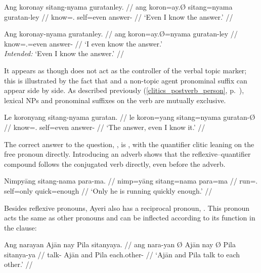 \pex
\a\label{ex:sitangquant}\begingl
	\gla Ang koronay sitang-nyama guratanley. //
	\glb ang koron=ay.Ø sitang=nyama guratan-ley //
	\glc \AgtT{} know=\Fsg{}.\Top{} self=even answer-\PargI{} //
	\glft `Even I know the answer.' //
\endgl

\a\label{ex:nositangquant}\ljudge\excl\begingl
	\gla Ang koronay-nyama guratanley. //
	\glb ang koron=ay.Ø=nyama guratan-ley //
	\glc \AgtT{} know=\Fsg{}.\Top{}=even answer-\PargI{} //
	\glft `I even know the answer.' \\
		\textit{Intended:} `Even I know the answer.' //
\endgl
\xe

It appears as though  does not act as the controller of the
verbal topic marker; this is illustrated by the fact that 
and a non-topic agent pronominal suffix can appear side by side. As described
previously (\autoref{clitics_postverb_person},
p.~\pageref{clitics_postverb_person}), lexical NPs and pronominal suffixes on
the verb are mutually exclusive.

\ex\begingl
	\gla Le koronyang sitang-nyama guratan. //
	\glb le koron=yang sitang=nyama guratan-Ø //
	\glc \PatTI{} know=\Fsg{}.\Aarg{} self=even answer-\Top{} //
	\glft `The answer, even I know it.' //
\endgl\xe

The correct answer to the question, , is ,
with the quantifier clitic leaning on the free pronoun directly. Introducing an
adverb shows that the reflexive--quantifier compound follows the conjugated
verb directly, even before the adverb.

\ex\begingl
	\gla Nimpyāng sitang-nama para-ma. //
	\glb nimp=yāng sitang=nama para=ma //
	\glc run=\TsgM{}.\Aarg{} self=only quick=enough //
	\glft `Only he is running quickly enough.' //
\endgl\xe


Besides reflexive pronouns, Ayeri also has a reciprocal pronoun,
. This pronoun acts the same as other pronouns
and can be inflected according to its function in the clause:

\pex
\a\begingl
	\gla Ang narayan {} Ajān nay {} Pila sitanyaya. //
	\glb ang nara-yan Ø Ajān nay Ø Pila sitanya-ya //
	\glc \AgtT{} talk-\TplM{} \Top{} Ajān and \Top{} Pila each.other-\Loc{} //
	\glft `Ajān and Pila talk to each other.' //
\endgl

